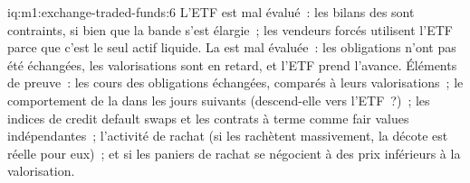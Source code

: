 \begin{solution}{iq:m1:exchange-traded-funds:6}
L'ETF est mal évalué~: les bilans des  sont contraints, si bien que
la bande s'est élargie~; les vendeurs forcés utilisent l'ETF parce que c'est le seul
actif liquide. La  est mal évaluée~: les obligations n'ont pas été échangées, les valorisations sont en retard, et
l'ETF prend l'avance. Éléments de preuve~: les cours des obligations échangées, comparés à leurs valorisations~;
le comportement de la  dans les jours suivants (descend-elle vers
l'ETF~?)~; les indices de credit default swaps et les contrats à terme comme fair values indépendantes~;
l'activité de rachat (si les  rachètent massivement, la décote est réelle pour eux)~; et
si les paniers de rachat se négocient à des prix inférieurs à la
valorisation.
\end{solution}
